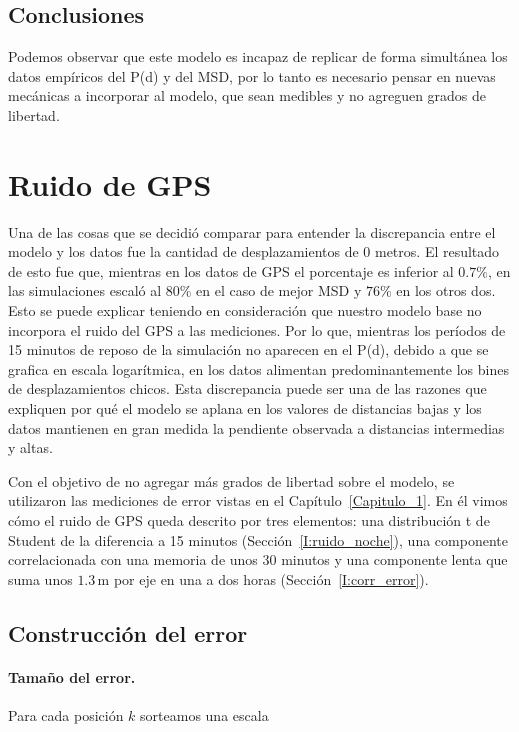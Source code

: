 \subsection{Conclusiones}\label{II:Conclusiones_mod_simple}

Podemos observar que este modelo es incapaz de replicar de forma simultánea los datos empíricos del P(d) y del MSD, por lo tanto es necesario pensar en nuevas mecánicas a 
incorporar al modelo, que sean medibles y no agreguen grados de libertad. 

\section{Ruido de GPS}\label{II:Agregamos_ruido}

Una de las cosas que se decidió comparar para entender la discrepancia entre el modelo y los datos fue la cantidad de desplazamientos de 0 metros. El resultado de 
esto fue que, mientras en los datos de GPS el porcentaje es inferior al $0.7 \%$, en las simulaciones escaló al $80 \%$ en el caso de mejor MSD y $76 \%$ en los otros dos. 
Esto se puede explicar teniendo en consideración que nuestro modelo base no incorpora el ruido del GPS a las mediciones. Por lo que, mientras los períodos de 15 minutos 
de reposo de la simulación no aparecen en el P(d), debido a que se grafica en escala logarítmica, en los datos alimentan predominantemente los bines de desplazamientos 
chicos. Esta discrepancia puede ser una de las razones que expliquen por qué el modelo se aplana en los valores de distancias bajas y los datos mantienen en gran 
medida la pendiente observada a distancias intermedias y altas.

Con el objetivo de no agregar más grados de libertad sobre el modelo, se utilizaron las mediciones de error vistas en el Capítulo~\ref{Capitulo_1}. En él vimos cómo 
el ruido de GPS queda descrito por tres elementos: una distribución t de Student de la diferencia a 15 minutos (Sección~\ref{I:ruido_noche}), una componente correlacionada 
con una memoria de unos 30 minutos y una componente lenta que suma unos $1.3\,\mathrm{m}$ por eje en una a dos horas (Sección~\ref{I:corr_error}). 

\subsection{Construcción del error}\label{II:error_construccion}

\paragraph{Tamaño del error.} Para cada posición $k$ sorteamos una escala

